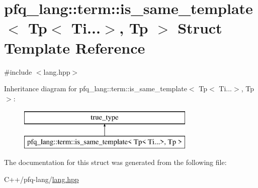 \hypertarget{structpfq__lang_1_1term_1_1is__same__template_3_01Tp_3_01Ti_8_8_8_4_00_01Tp_01_4}{\section{pfq\-\_\-lang\-:\-:term\-:\-:is\-\_\-same\-\_\-template$<$ Tp$<$ Ti...$>$, Tp $>$ Struct Template Reference}
\label{structpfq__lang_1_1term_1_1is__same__template_3_01Tp_3_01Ti_8_8_8_4_00_01Tp_01_4}
}


{\ttfamily \#include $<$lang.\-hpp$>$}

Inheritance diagram for pfq\-\_\-lang\-:\-:term\-:\-:is\-\_\-same\-\_\-template$<$ Tp$<$ Ti...$>$, Tp $>$\-:\begin{figure}[H]
\begin{center}
\leavevmode
\includegraphics[height=2.000000cm]{structpfq__lang_1_1term_1_1is__same__template_3_01Tp_3_01Ti_8_8_8_4_00_01Tp_01_4}
\end{center}
\end{figure}


The documentation for this struct was generated from the following file\-:\begin{DoxyCompactItemize}
\item 
C++/pfq-\/lang/\hyperlink{lang_8hpp}{lang.\-hpp}\end{DoxyCompactItemize}
